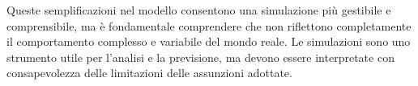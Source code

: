 Queste semplificazioni nel modello consentono una simulazione più 
gestibile e comprensibile, ma è fondamentale comprendere che non 
riflettono completamente il comportamento complesso e variabile 
del mondo reale. Le simulazioni sono uno strumento utile per l'analisi 
e la previsione, ma devono essere interpretate con consapevolezza delle 
limitazioni delle assunzioni adottate.